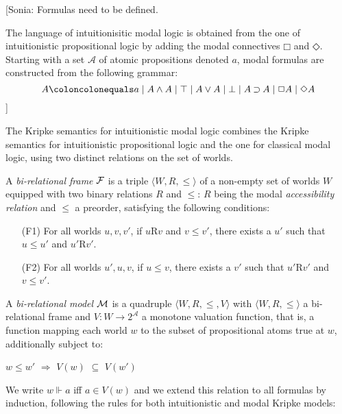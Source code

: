 \documentclass[twoside]{aiml18}
\newcommand{\sonia}[1]{{\color{blue}[Sonia: #1]}}
\newcommand*{\NOT}{\neg}
\newcommand*{\AND}{\mathbin{\wedge}}
\newcommand*{\TOP}{\mathord{\top}}
\newcommand*{\OR}{\mathbin{\vee}}
\newcommand*{\BOT}{\mathord{\bot}}
\newcommand*{\IMP}{\mathbin{\supset}}
\newcommand*{\BOX}{\mathord{\Box}}
\newcommand*{\DIA}{\mathord{\Diamond}}
\begin{document}
\sonia{Formulas need to be defined.

The language of {intuitionisitic modal logic} is obtained from the one of intuitionistic propositional logic by adding the modal connectives $\BOX$ and $\DIA$. %
%
Starting with a set $\mathcal{A}$ of atomic propositions denoted $a$, modal formulas are constructed from the following grammar:
%
$$
A  \coloncolonequals
a \mid A \AND A \mid \TOP \mid A \OR A \mid \BOT \mid A \IMP A \mid \BOX A \mid \DIA A
$$
%
}

The Kripke semantics for intuitionistic modal logic combines the Kripke semantics for intuitionistic propositional logic and the one for classical modal logic, using two distinct relations on the set of worlds.

\begin{definition}
A \emph{bi-relational frame} $\mathcal{F}$ is a triple $\langle W, R, \le \rangle$ of a non-empty set of worlds $W$ equipped with two binary relations $R$ and $\le$: $R$ being the modal \emph{accessibility relation} and $\le$ a preorder, satisfying the following conditions:
\begin{itemize}
\item[(F1)] For all worlds $u, v, v'$, if $u$R$v$ and $v \le v'$, there exists a $u'$ such that $u \le u'$ and $u'$R$v'$.

\item[(F2)] For all worlds $u', u, v$, if $u \le v$, there exists a $v'$ such that $u'$R$v'$ and $v\le v'$.
\end{itemize}

\end{definition}

\begin{definition}
A \emph{bi-relational model} $\mathcal{M}$ is a quadruple $\langle W, R,\le,V \rangle$ with $\langle W, R, \le \rangle$ a bi-relational frame and $V: W \to 2^\mathcal{A}$ a monotone valuation function, that is, a function mapping each world $w$ to the subset of propositional atoms true at $w$, additionally subject to:
\begin{center}
$w \le w'$ $\Rightarrow$ $V(w)$ $\subseteq$ $V(w')$
\end{center}

\end{definition}

\vspace{4mm}

We write $w \Vdash a$ iff $a \in V(w)$ and we extend this relation to all formulas by induction, following the rules for both intuitionistic and modal Kripke models:
\end{document}
